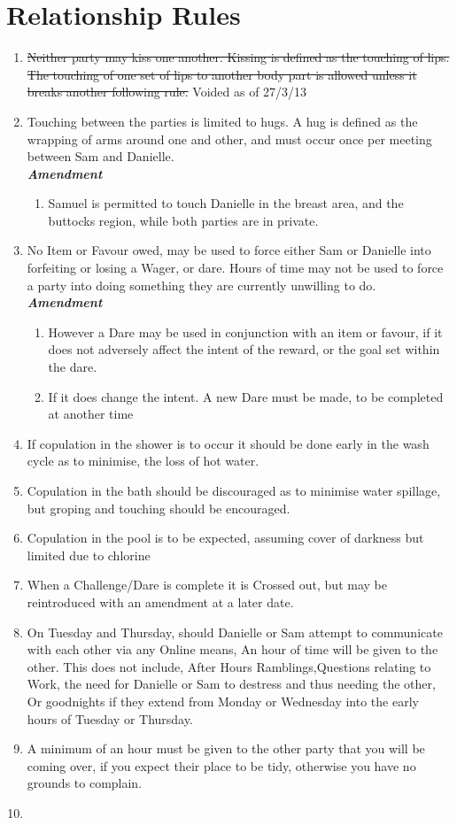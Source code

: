 
 \section{Relationship Rules}
\begin{enumerate}
  \item \sout{Neither party may kiss one another. Kissing is defined as the touching of lips. The touching of one set of lips to another
   body part is allowed unless it breaks another following rule.} Voided as of 27/3/13
  \item Touching between the parties is limited to hugs. A hug is defined as the wrapping of arms around one and other, and
   must occur once per meeting between Sam and Danielle.
   \\\textbf{\emph{Amendment}}
  \begin{enumerate}
    \item Samuel is permitted to touch Danielle in the breast area, and the buttocks region, while both parties are in private. 
  \end{enumerate}
  \item  No Item or Favour owed, may be used to force either Sam or Danielle into forfeiting or losing a Wager, or dare. 
  Hours of time may not be used to force a party into doing something they are currently unwilling to do. 
  \\ \textbf{\emph{Amendment}}
  \begin{enumerate}
    \item However a Dare may be used in conjunction with an item or favour, if it does not adversely affect the intent 
    of the reward, or the goal set within the dare.
    \item  If it does change the intent. A new Dare must be made, to be completed at another time
  \end{enumerate}
  \item If copulation in the shower is to occur it should be done early in the wash cycle as to minimise, the loss of hot water.
  \item Copulation in the bath should be discouraged as to minimise water spillage, but groping and touching should be encouraged.
  \item Copulation in the pool is to be expected, assuming cover of darkness but limited due to chlorine
  \item When a Challenge/Dare is complete it is Crossed out, but may be reintroduced with an amendment at a later date.
  \item On Tuesday and Thursday, should Danielle or Sam attempt to communicate with each other via any Online means, 
  An hour of time will be given to the other. This does not include, After Hours Ramblings,Questions relating to Work, 
  the need for Danielle or Sam to destress and thus needing the other, Or goodnights if they extend from Monday or Wednesday 
  into the early hours of Tuesday or Thursday.
  \item A minimum of an hour must be given to the other party that you will be coming over, if you expect their place to be tidy,
  otherwise you have no grounds to complain.
  \item 
\end{enumerate}
 




 

 

 